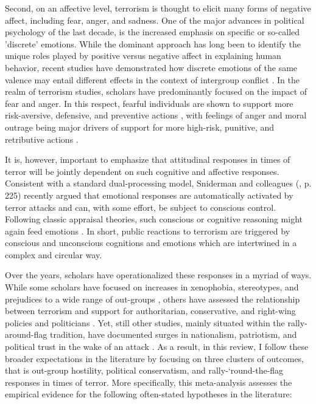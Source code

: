 Second, on an {affective} level, terrorism is thought to elicit many forms of negative affect, including fear, anger, and sadness. One of the major advances in political psychology of the last decade, is the increased emphasis on specific or so-called 'discrete' emotions. While the dominant approach has long been to identify the unique roles played by positive versus negative affect in explaining human behavior, recent studies have demonstrated how discrete emotions of the same valence may entail different effects in the context of intergroup conflict \citep{Pliskin2020}. In the realm of terrorism studies, scholars have predominantly focused on the impact of fear and anger. In this respect, fearful individuals are shown to support more risk-aversive, defensive, and preventive actions \citep{Huddy2005, Lerner2003a, Skitka2006}, with feelings of anger and moral outrage being major drivers of support for more high-risk, punitive, and retributive actions \citep{Fisk2019a, Skitka2006, Wayne2018, Liberman2019a}.


It is, however, important to emphasize that attitudinal responses in times of terror will be jointly dependent on such cognitive and affective responses. Consistent with a standard dual-processing model, Sniderman and colleagues (\citeyear{Sniderman2019a}, p. 225) recently argued that emotional responses are automatically activated by terror attacks and can, with some effort, be subject to conscious control. Following classic appraisal theories, such conscious or cognitive reasoning might again feed emotions \citep{Moors2013}. In short, public reactions to terrorism are triggered by conscious and unconscious cognitions and emotions which are intertwined in a complex and circular way. 



Over the years, scholars have operationalized these responses in a myriad of ways. While some scholars have focused on increases in xenophobia, stereotypes, and prejudices to a wide range of out-groups \citep[e.g.,][]{Ferwerda2017, Choma2018, Maoz2008, Saleem2013}, others have assessed the relationship between terrorism and support for authoritarian, conservative, and right-wing policies and politicians \citep[e.g.,][]{Vasilopoulos2019c, Stroessner2015a, Brinson2012b}. Yet, still other studies, mainly situated within the rally-around-flag tradition, have documented surges in nationalism, patriotism, and political trust in the wake of an attack \citep[e.g.,][]{Feinstein2018, Ladd2007, Landau2004}. As a result, in this review, I follow these broader expectations in the literature by focusing on three clusters of outcomes, that is out-group hostility, political conservatism, and rally-‘round-the-flag responses in times of terror. More specifically, this meta-analysis assesses the empirical evidence for the following often-stated hypotheses in the literature: 


